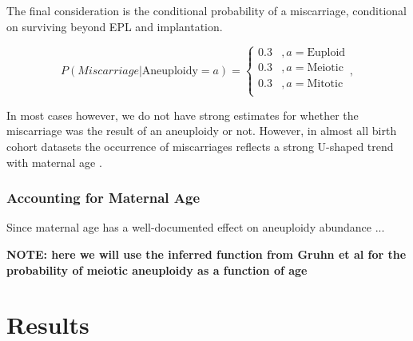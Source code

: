 \documentclass{article}
\begin{document}
The final consideration is the conditional probability of a miscarriage, conditional on surviving beyond EPL and implantation. 

\begin{equation}
	P(Miscarriage | \text{Aneuploidy}=a) = \begin{cases}
	0.3 &, a= \text{Euploid}\\
	0.3 &, a = \text{Meiotic}\\
	0.3 &, a = \text{Mitotic}\\
	\end{cases},
\end{equation}


In most cases however, we do not have strong estimates for whether the miscarriage was the result of an aneuploidy or not. However, in almost all birth cohort datasets the occurrence of miscarriages reflects a strong U-shaped trend  with maternal age \citep{Gruhn2019-al}. 


\subsubsection*{Accounting for Maternal Age} 

Since maternal age has a well-documented effect on aneuploidy abundance ... 

\textbf{NOTE: here we will use the inferred function from Gruhn et al for the probability of meiotic aneuploidy as a function of age}



\section*{Results}






\end{document}
